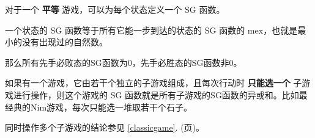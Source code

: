 对于一个 \textbf{平等} 游戏，可以为每个状态定义一个 SG 函数。

一个状态的 SG 函数等于所有它能一步到达的状态的 SG 函数的 $\text{mex}$，也就是最小的没有出现过的自然数。

那么所有先手必败态的SG函数为$0$，先手必胜态的SG函数非$0$。

如果有一个游戏，它由若干个独立的子游戏组成，且每次行动时 \textbf{只能选一个} 子游戏进行操作，则这个游戏的 SG 函数就是所有子游戏的SG函数的异或和。比如最经典的Nim游戏，每次只能选一堆取若干个石子。

同时操作多个子游戏的结论参见 \ref{classicgame}. (\pageref{classicgame}页)。

